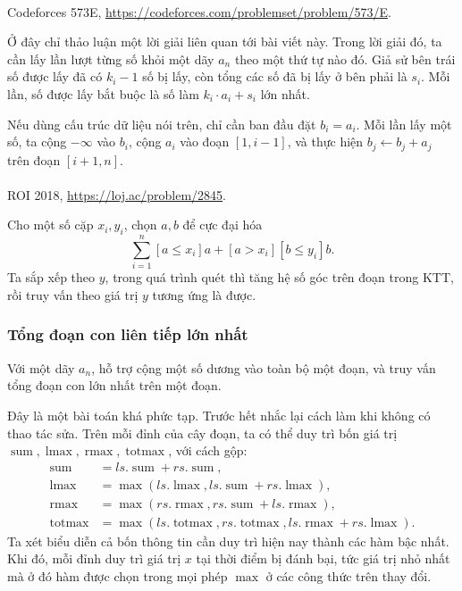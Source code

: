 \documentclass[11pt]{article}
\begin{document}
\paragraph{}
 Codeforces 573E, \url{https://codeforces.com/problemset/problem/573/E}.

Ở đây chỉ thảo luận một lời giải liên quan tới bài viết này. Trong lời giải đó,
ta cần lấy lần lượt từng số khỏi một dãy \(a_n\) theo một thứ tự nào đó. Giả sử
bên trái số được lấy đã có \(k_i-1\) số bị lấy, còn tổng các số đã bị lấy ở bên
phải là \(s_i\). Mỗi lần, số được lấy bắt buộc là số làm \(k_i\cdot a_i+s_i\)
lớn nhất.

Nếu dùng cấu trúc dữ liệu nói trên, chỉ cần ban đầu đặt \(b_i=a_i\). Mỗi lần lấy
một số, ta cộng \(-\infty\) vào \(b_i\), cộng \(a_i\) vào đoạn \([1,i-1]\), và
thực hiện \(b_j\gets b_j+a_j\) trên đoạn \([i+1,n]\).

\paragraph{}
 ROI 2018, \url{https://loj.ac/problem/2845}.

Cho một số cặp \(x_i,y_i\), chọn \(a,b\) để cực đại hóa
\[
  \sum_{i=1}^n [a\le x_i]a+[a>x_i][b\le y_i]b.
\]
Ta sắp xếp theo \(y\), trong quá trình quét thì tăng hệ số góc trên đoạn trong
KTT, rồi truy vấn theo giá trị \(y\) tương ứng là được.

\subsubsection{Tổng đoạn con liên tiếp lớn nhất}

 Với một dãy \(a_n\), hỗ trợ cộng một số dương vào toàn bộ
một đoạn, và truy vấn tổng đoạn con lớn nhất trên một đoạn.

 Đây là một bài toán khá phức tạp. Trước hết nhắc lại cách làm
khi không có thao tác sửa. Trên mỗi đỉnh của cây đoạn, ta có thể duy trì bốn
giá trị \(\operatorname{sum},\operatorname{lmax},\operatorname{rmax},
\operatorname{totmax}\), với cách gộp:
\[
\begin{aligned}
\operatorname{sum} &= ls.\operatorname{sum}+rs.\operatorname{sum},\\
\operatorname{lmax} &= \max(ls.\operatorname{lmax},
  ls.\operatorname{sum}+rs.\operatorname{lmax}),\\
\operatorname{rmax} &= \max(rs.\operatorname{rmax},
  rs.\operatorname{sum}+ls.\operatorname{rmax}),\\
\operatorname{totmax} &= \max(ls.\operatorname{totmax},
  rs.\operatorname{totmax},ls.\operatorname{rmax}+rs.\operatorname{lmax}).
\end{aligned}
\]
Ta xét biểu diễn cả bốn thông tin cần duy trì hiện nay thành các hàm bậc nhất.
Khi đó, mỗi đỉnh duy trì giá trị \(x\) tại thời điểm bị đánh bại, tức giá trị
nhỏ nhất mà ở đó hàm được chọn trong mọi phép \(\max\) ở các công thức trên thay
đổi.
\end{document}
